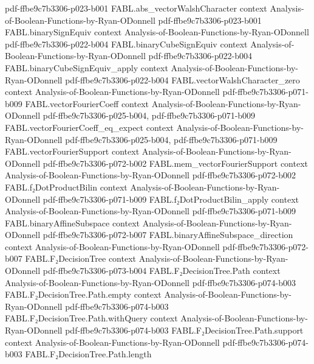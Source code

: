 \begin{theorem}
  {pdf-ffbe9c7b3306-p023-b001}
\proofstep
  {FABL.abs_vectorWalshCharacter}
  {context}
  {Analysis-of-Boolean-Functions-by-Ryan-ODonnell}
  {pdf-ffbe9c7b3306-p023-b001}
\proofstep
  {FABL.binarySignEquiv}
  {context}
  {Analysis-of-Boolean-Functions-by-Ryan-ODonnell}
  {pdf-ffbe9c7b3306-p022-b004}
\proofstep
  {FABL.binaryCubeSignEquiv}
  {context}
  {Analysis-of-Boolean-Functions-by-Ryan-ODonnell}
  {pdf-ffbe9c7b3306-p022-b004}
\proofstep
  {FABL.binaryCubeSignEquiv_apply}
  {context}
  {Analysis-of-Boolean-Functions-by-Ryan-ODonnell}
  {pdf-ffbe9c7b3306-p022-b004}
\proofstep
  {FABL.vectorWalshCharacter_zero}
  {context}
  {Analysis-of-Boolean-Functions-by-Ryan-ODonnell}
  {pdf-ffbe9c7b3306-p071-b009}
\proofstep
  {FABL.vectorFourierCoeff}
  {context}
  {Analysis-of-Boolean-Functions-by-Ryan-ODonnell}
  {pdf-ffbe9c7b3306-p025-b004,
    pdf-ffbe9c7b3306-p071-b009}
\proofstep
  {FABL.vectorFourierCoeff_eq_expect}
  {context}
  {Analysis-of-Boolean-Functions-by-Ryan-ODonnell}
  {pdf-ffbe9c7b3306-p025-b004,
    pdf-ffbe9c7b3306-p071-b009}
\proofstep
  {FABL.vectorFourierSupport}
  {context}
  {Analysis-of-Boolean-Functions-by-Ryan-ODonnell}
  {pdf-ffbe9c7b3306-p072-b002}
\proofstep
  {FABL.mem_vectorFourierSupport}
  {context}
  {Analysis-of-Boolean-Functions-by-Ryan-ODonnell}
  {pdf-ffbe9c7b3306-p072-b002}
\proofstep
  {FABL.f₂DotProductBilin}
  {context}
  {Analysis-of-Boolean-Functions-by-Ryan-ODonnell}
  {pdf-ffbe9c7b3306-p071-b009}
\proofstep
  {FABL.f₂DotProductBilin_apply}
  {context}
  {Analysis-of-Boolean-Functions-by-Ryan-ODonnell}
  {pdf-ffbe9c7b3306-p071-b009}
\proofstep
  {FABL.binaryAffineSubspace}
  {context}
  {Analysis-of-Boolean-Functions-by-Ryan-ODonnell}
  {pdf-ffbe9c7b3306-p072-b007}
\proofstep
  {FABL.binaryAffineSubspace_direction}
  {context}
  {Analysis-of-Boolean-Functions-by-Ryan-ODonnell}
  {pdf-ffbe9c7b3306-p072-b007}
\proofstep
  {FABL.F₂DecisionTree}
  {context}
  {Analysis-of-Boolean-Functions-by-Ryan-ODonnell}
  {pdf-ffbe9c7b3306-p073-b004}
\proofstep
  {FABL.F₂DecisionTree.Path}
  {context}
  {Analysis-of-Boolean-Functions-by-Ryan-ODonnell}
  {pdf-ffbe9c7b3306-p074-b003}
\proofstep
  {FABL.F₂DecisionTree.Path.empty}
  {context}
  {Analysis-of-Boolean-Functions-by-Ryan-ODonnell}
  {pdf-ffbe9c7b3306-p074-b003}
\proofstep
  {FABL.F₂DecisionTree.Path.withQuery}
  {context}
  {Analysis-of-Boolean-Functions-by-Ryan-ODonnell}
  {pdf-ffbe9c7b3306-p074-b003}
\proofstep
  {FABL.F₂DecisionTree.Path.support}
  {context}
  {Analysis-of-Boolean-Functions-by-Ryan-ODonnell}
  {pdf-ffbe9c7b3306-p074-b003}
\proofstep
  {FABL.F₂DecisionTree.Path.length}

\end{theorem}
